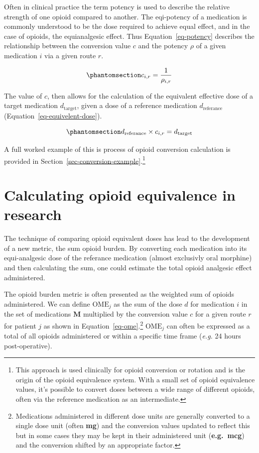 \documentclass[
  letterpaper,
  DIV=11,
  numbers=noendperiod]{scrreprt}
\begin{document}
Often in clinical practice the term potency is used to describe the
relative strength of one opioid compared to another. The eqi-potency of
a medication is commonly understood to be the dose required to achieve
equal effect, and in the case of opioids, the equianalgesic effect. Thus
Equation~\ref{eq-potency} describes the relationship between the
conversion value \(c\) and the potency \(\rho\) of a given medication
\(i\) via a given route \(r\).

\begin{equation}\phantomsection\label{eq-potency}{c_{i,r} = \frac{1}{\rho_{i,r}}
}\end{equation}

The value of \(c\), then allows for the calculation of the equivalent
effective dose of a target medication \(d_{\text{target}}\), given a
dose of a reference medication \(d_{\text{referance}}\)
(Equation~\ref{eq-equivelent-dose}).

\begin{equation}\phantomsection\label{eq-equivelent-dose}{
d_{\text{referance}} \times c_{i,r} = d_{\text{target}}
}\end{equation}

A full worked example of this is process of opioid conversion
calculation is provided in
Section~\ref{sec-conversion-example}.\footnote{This approach is used
  clinically for opioid conversion or rotation and is the origin of the
  opioid equivalence system. With a small set of opioid equivalence
  values, it's possible to convert doses between a wide range of
  different opioids, often via the reference medication as an
  intermediate.}

\section{Calculating opioid equivalence in
research}\label{calculating-opioid-equivalence-in-research}

The technique of comparing opioid equivalent doses has lead to the
development of a new metric, the sum opioid burden. By converting each
medication into its equi-analgesic dose of the referance medication
(almost exclusivly oral morphine) and then calculating the sum, one
could estimate the total opioid analgesic effect administered.

The opioid burden metric is often presented as the weighted sum of
opioids administered. We can define \(\text{OME}_j\) as the sum of the
dose \(d\) for medication \(i\) in the set of medications \(\mathbf{M}\)
multiplied by the conversion value \(c\) for a given route \(r\) for
patient \(j\) as shown in Equation~\ref{eq-ome}.\footnote{Medications
  administered in different dose units are generally converted to a
  single dose unit (often \textbf{mg}) and the conversion values updated
  to reflect this but in some cases they may be kept in their
  administered unit (\textbf{e.g.~mcg}) and the conversion shifted by an
  appropriate factor.} \(\text{OME}_j\) can often be expressed as a
total of all opioids administered or within a specific time frame
(\emph{e.g.} 24 hours post-operative).
\end{document}
